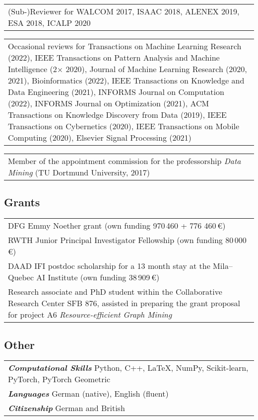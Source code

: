 \documentclass[11pt, a4paper, DIV=12]{scrartcl}
\begin{document}
\begin{tabular}{p{14.5cm}}
(Sub-)Reviewer for WALCOM 2017, ISAAC 2018, ALENEX 2019, ESA 2018, ICALP 2020 \\[0.5em]
\end{tabular}

\begin{tabular}{p{14.5cm}}
Occasional reviews for Transactions on Machine Learning Research (2022), IEEE Transactions on Pattern Analysis and Machine Intelligence (2$\times$ 2020), Journal of Machine Learning Research (2020, 2021), Bioinformatics (2022), IEEE Transactions on Knowledge and Data Engineering (2021), INFORMS Journal on Computation (2022), INFORMS Journal on Optimization (2021), ACM Transactions on Knowledge Discovery from Data (2019), IEEE Transactions on Cybernetics (2020), IEEE Transactions on Mobile Computing (2020), Elsevier Signal Processing (2021)\\[0.5em]
\end{tabular}

\begin{tabular}{p{14.5cm}}
Member of the appointment commission for the professorship \emph{Data Mining} (TU Dortmund University, 2017)
\end{tabular}

\subsection*{Grants}
\begin{tabular}{p{14.5cm}}
	DFG Emmy Noether grant (own funding 970\,460 + 776 460\,€)\\[0.5em]
	
	RWTH Junior Principal Investigator Fellowship (own funding 80\,000 €)\\[0.5em]

	DAAD IFI postdoc scholarship for a 13 month stay at the Mila--Quebec AI Institute (own funding 38\,909\,€)\\[0.5em]
		
	Research associate and PhD student  within the Collaborative Research Center SFB 876, assisted in preparing the  grant proposal for project A6 \emph{Resource-efficient Graph Mining}
\end{tabular}


\subsection*{Other}

\begin{tabular}{l}
	\textsf{\textbf{\em Computational Skills}} Python, C\hspace{-1pt}+\hspace{-1pt}+, \LaTeX, NumPy, Scikit-learn, PyTorch, PyTorch Geometric\\
	\textsf{\textbf{\em Languages}} German (native), English (fluent)\\
	\textsf{\textbf{\em Citizenship}} German and British
\end{tabular}
\end{document}
